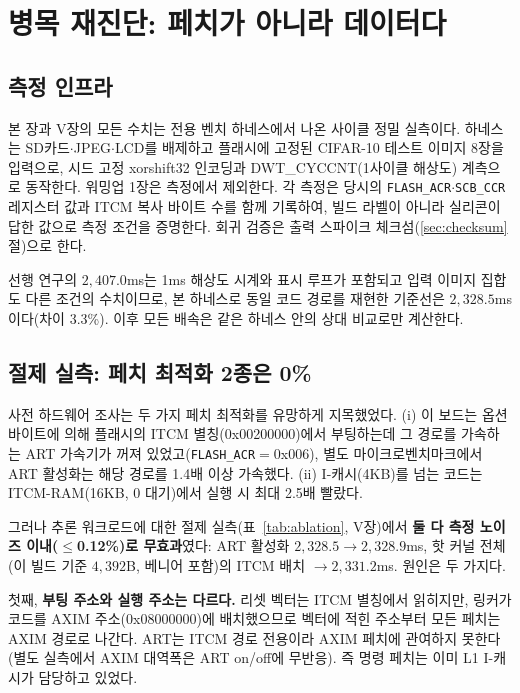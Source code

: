 \section{병목 재진단: 페치가 아니라 데이터다}\label{sec:bottleneck}

\subsection{측정 인프라}

본 장과 V장의 모든 수치는 전용 벤치 하네스에서 나온
사이클 정밀 실측이다. 하네스는 SD카드$\cdot$JPEG$\cdot$LCD를 배제하고
플래시에 고정된 CIFAR-10 테스트 이미지 8장을 입력으로, 시드 고정
xorshift32 인코딩과 DWT\_CYCCNT(1사이클 해상도) 계측으로 동작한다.
워밍업 1장은 측정에서 제외한다. 각 측정은 당시의
\texttt{FLASH\_ACR}$\cdot$\texttt{SCB\_CCR} 레지스터 값과 ITCM 복사
바이트 수를 함께 기록하여, 빌드 라벨이 아니라 실리콘이 답한 값으로
측정 조건을 증명한다. 회귀 검증은 출력 스파이크
체크섬(\ref{sec:checksum}절)으로 한다.

선행 연구의 $2{,}407.0$ms는 1ms 해상도 시계와 표시 루프가 포함되고
입력 이미지 집합도 다른 조건의 수치이므로, 본 하네스로 동일 코드
경로를 재현한 기준선은 $2{,}328.5$ms이다(차이 3.3\%). 이후 모든
배속은 같은 하네스 안의 상대 비교로만 계산한다.

\subsection{절제 실측: 페치 최적화 2종은 0\%}

사전 하드웨어 조사는 두 가지 페치 최적화를 유망하게 지목했었다.
(i) 이 보드는 옵션 바이트에 의해 플래시의 ITCM 별칭(0x00200000)에서
부팅하는데 그 경로를 가속하는 ART 가속기가 꺼져
있었고(\texttt{FLASH\_ACR}$=$0x006), 별도 마이크로벤치마크에서 ART
활성화는 해당 경로를 1.4배 이상 가속했다. (ii) I-캐시(4KB)를 넘는
코드는 ITCM-RAM(16KB, 0 대기)에서 실행 시 최대 2.5배 빨랐다.

그러나 추론 워크로드에 대한 절제 실측(표~\ref{tab:ablation},
V장)에서 \textbf{둘 다 측정 노이즈 이내($\le$0.12\%)로 무효과}였다:
ART 활성화 $2{,}328.5\rightarrow2{,}328.9$ms, 핫 커널 전체(이 빌드
기준 $4{,}392$B, 베니어 포함)의 ITCM 배치
$\rightarrow2{,}331.2$ms. 원인은 두 가지다.

첫째, \textbf{부팅 주소와 실행 주소는 다르다.} 리셋 벡터는 ITCM 별칭에서
읽히지만, 링커가 코드를 AXIM 주소(0x08000000)에 배치했으므로 벡터에
적힌 주소부터 모든 페치는 AXIM 경로로 나간다. ART는 ITCM 경로
전용이라 AXIM 페치에 관여하지 못한다(별도 실측에서 AXIM 대역폭은 ART
on/off에 무반응). 즉 명령 페치는 이미 L1 I-캐시가 담당하고 있었다.

